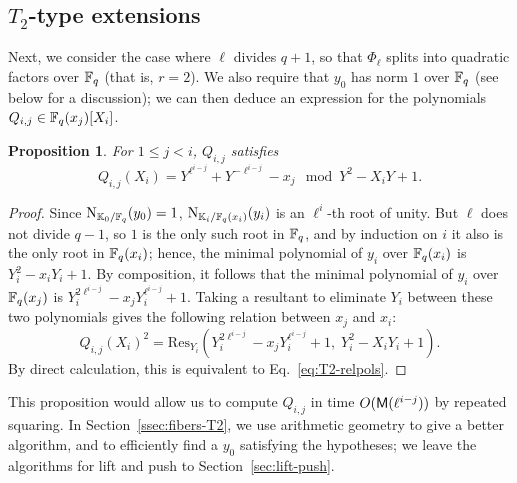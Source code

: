 \documentclass{sig-alternate}
\newtheorem{proposition}[definition]{Proposition}
\begin{document}

\subsection{$T_2$-type extensions}
\label{ssec:T2}

Next, we consider the case where $\ell$ divides $q+1$, so that
$\Phi_\ell$ splits into quadratic factors over $\mathbb{F}_q$ (that is,
$r=2$). We also require that $y_0$ has norm $1$ over $\mathbb{F}_q$ (see below
for a discussion); we can then deduce an expression for the
polynomials $Q_{i,j} \in \mathbb{F}_q(x_{j})[X_i]$.

\begin{proposition}
  \label{th:T2-resultant}
  For $1 \le j < i$, $Q_{i,j}$ satisfies
  \begin{equation}
    \label{eq:T2-relpols}
    Q_{i,j}(X_i) = Y^{\ell^{i-j}} + Y^{-\ell^{i-j}} - x_j \mod Y^2-X_iY+1.
  \end{equation}
\end{proposition}
\begin{proof}
  Since $\operatorname{N}_{\mathbb{K}_0/\mathbb{F}_q}(y_0)=1$, $\operatorname{N}_{\mathbb{K}_i/\mathbb{F}_q(x_i)}(y_i)$ is
  an $\ell^i$-th root of unity. But $\ell$ does not divide $q-1$, so
  $1$ is the only such root in $\mathbb{F}_q$, and by induction on $i$ it also
  is the only root in $\mathbb{F}_q(x_i)$; hence, the minimal polynomial of
  $y_i$ over $\mathbb{F}_q(x_i)$ is $Y_i^2 -x_i Y_i +1$. By composition, it
  follows that the minimal polynomial of $y_i$ over $\mathbb{F}_q(x_{j})$ is
  $Y_i^{2\ell^{i-j}}-x_{j} Y_i^{\ell^{i-j}}+1$. Taking a resultant to
  eliminate $Y_i$
  between these two polynomials gives the following relation between
  $x_{j}$ and $x_i$:
  \begin{equation*}
    Q_{i,j}(X_i)^2 = \mathrm{Res}_{Y_i}(Y_i^{2\ell^{i-j}}-x_{j}Y_i^{\ell^{i-j}}+1,\; Y_i^2-X_i Y_i+1).
  \end{equation*}
  By direct calculation, this is equivalent to
  Eq.~\eqref{eq:T2-relpols}.
\end{proof}

This proposition would allow us to compute $Q_{i,j}$ in time
$O(\mathsf{M}(\ell^{i-j}))$ by repeated squaring. In
Section~\ref{ssec:fibers-T2}, we use arithmetic geometry to give a
better algorithm, and to efficiently find a $y_0$ satisfying the
hypotheses; we leave the algorithms for lift and push to
Section~\ref{sec:lift-push}.

\end{document}
